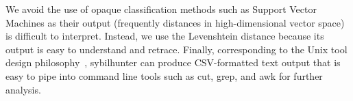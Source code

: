We avoid the use of opaque classification methods such as Support Vector
Machines as their output (frequently distances in high-dimensional vector space)
is difficult to interpret.  Instead, we use the Levenshtein distance because its
output is easy to understand and retrace.  Finally, corresponding to the Unix
tool design philosophy~\cite{Pike1983a}, sybilhunter can produce CSV-formatted
text output that is easy to pipe into command line tools such as cut, grep, and
awk for further analysis.
